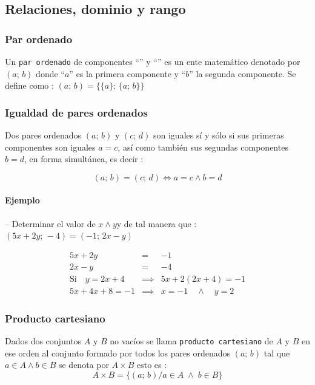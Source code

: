 \documentclass{article}
\begin{document}
\subsection*{Relaciones, dominio y rango}

\subsubsection*{Par ordenado}
\noindent Un {\tt par ordenado} de componentes ``'' y ``'' es un ente matemático denotado por $(a;\,b)$ donde ``$a$'' es la primera componente y ``$b$'' la segunda componente. Se define como : $(a;\,b) = \{\{a\};\,\{a;\,b\}\}$

\subsubsection*{Igualdad de pares ordenados}
\noindent Dos pares ordenados $(a;\,b)$ y $(c;\,d)$ son iguales sí y sólo si sus primeras componentes son iguales $a = c$, así como también sus segundas componentes $b = d$, en forma simultánea, es decir :
   
$$
(a;\,b) = (c;\,d) \iff a = c \wedge b = d
$$

\paragraph*{Ejemplo} -- Determinar el valor de \quad$x \wedge y$\quad y de tal manera que : \\ $(5x + 2y;\,-4) = (-1;\,2x - y)$

\begin{eqnarray*}
5x + 2y &=& -1 \\
2x - y &=& -4 \\
\text{Si}\quad y = 2x + 4 &\implies& 5x + 2 (2x + 4) = -1 \\
5x + 4x + 8 = -1 &\implies& x = -1\quad \wedge\quad y = 2
\end{eqnarray*}

\subsubsection*{Producto cartesiano}
\noindent Dados dos conjuntos $A$ y $B$ no vacíos se llama {\tt producto cartesiano} de $A$ y $B$ en ese orden al conjunto formado por todos los pares ordenados $(a;\,b)$ tal que $a \in A \wedge b \in B$ se denota por $A \times B$ esto es :
$$
A\times B = \{(a;\,b)/ a \in A \;\wedge\; b \in B\}
$$
\end{document}
